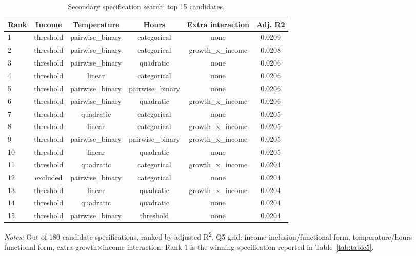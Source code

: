 \begin{table}[H]
    \centering
    \caption{Secondary specification search: top 15 candidates.}
    \begin{tabular}{ l c c c c c }
\hline \hline
Rank & Income & Temperature & Hours & Extra interaction & Adj. R2 \\
\hline
\hspace{0.05cm}  1 & threshold & pairwise\_binary & categorical & none & 0.0209 \\
\hspace{0.05cm}  2 & threshold & pairwise\_binary & categorical & growth\_x\_income & 0.0208 \\
\hspace{0.05cm}  3 & threshold & pairwise\_binary & quadratic & none & 0.0206 \\
\hspace{0.05cm}  4 & threshold & linear & categorical & none & 0.0206 \\
\hspace{0.05cm}  5 & threshold & pairwise\_binary & pairwise\_binary & none & 0.0206 \\
\hspace{0.05cm}  6 & threshold & pairwise\_binary & quadratic & growth\_x\_income & 0.0206 \\
\hspace{0.05cm}  7 & threshold & quadratic & categorical & none & 0.0205 \\
\hspace{0.05cm}  8 & threshold & linear & categorical & growth\_x\_income & 0.0205 \\
\hspace{0.05cm}  9 & threshold & pairwise\_binary & pairwise\_binary & growth\_x\_income & 0.0205 \\
\hspace{0.05cm} 10 & threshold & linear & quadratic & none & 0.0205 \\
\hspace{0.05cm} 11 & threshold & quadratic & categorical & growth\_x\_income & 0.0204 \\
\hspace{0.05cm} 12 & excluded & pairwise\_binary & categorical & none & 0.0204 \\
\hspace{0.05cm} 13 & threshold & linear & quadratic & growth\_x\_income & 0.0204 \\
\hspace{0.05cm} 14 & threshold & quadratic & quadratic & none & 0.0204 \\
\hspace{0.05cm} 15 & threshold & pairwise\_binary & threshold & none & 0.0204 \\
\hline \hline
\end{tabular}
\begin{tablenotes}
\small
\item \textit{Notes:} Out of 180 candidate specifications, ranked by adjusted R\textsuperscript{2}. Q5 grid: income inclusion/functional form, temperature/hours functional form, extra growth$\times$income interaction. Rank 1 is the winning specification reported in Table~\ref{tab:table5}.
\end{tablenotes}
    \label{tab:table6}
\end{table}
